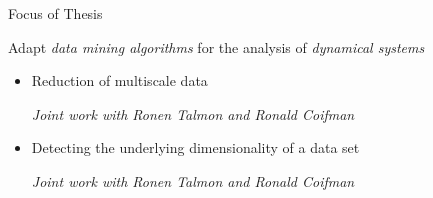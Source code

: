 \documentclass[12pt]{beamer}
\begin{document}
\begin{frame}{Focus of Thesis}

\centering


{\small Adapt {\em data mining algorithms} for the analysis of {\em dynamical systems} \par}

\begin{itemize}
\item Reduction of multiscale data \\
{\scriptsize \em Joint work with Ronen Talmon and Ronald Coifman \par}


\item Detecting the underlying dimensionality of a data set \\
{\scriptsize \em Joint work with Ronen Talmon and Ronald Coifman \par}


\end{itemize}
\end{frame}
\end{document}
